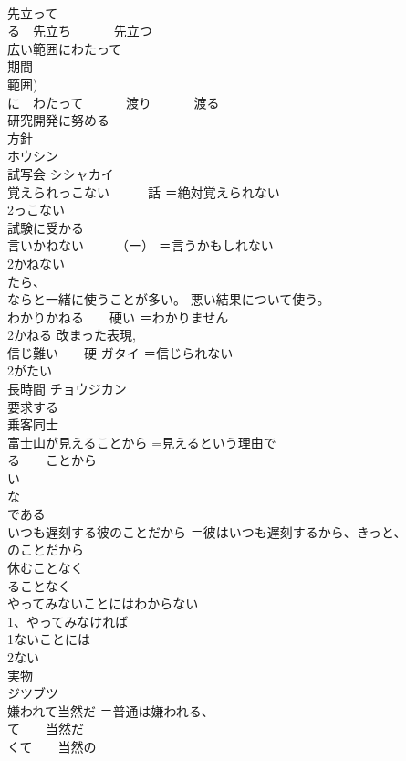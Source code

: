 \documentclass[8pt]{extreport}
\begin{document}
\begin{CJK}{UTF8}{min}
\\	先立って 
\\	る　先立ち 　　　先立つ
\\	広い範囲にわたって	
\\	期間 
\\	範囲) 
\\	に　わたって 　　　渡り 　　　渡る
\\	研究開発に努める	
\\	方針	
\\	ホウシン
\\	試写会	シシャカイ 
\\	覚えられっこない　　　話	＝絶対覚えられない 
\\	2っこない
\\	試験に受かる	
\\	言いかねない　　　（ー）	＝言うかもしれない 
\\	2かねない 
\\	たら、
\\	ならと一緒に使うことが多い。 悪い結果について使う。
\\	わかりかねる　　硬い	＝わかりません 
\\	2かねる 改まった表現, 
\\	信じ難い　　硬	ガタイ ＝信じられない 
\\	2がたい
\\	長時間	チョウジカン 
\\	要求する	
\\	乗客同士	
\\	富士山が見えることから	=見えるという理由で 
\\	る　　ことから 
\\	い 
\\	な 
\\	である
\\	いつも遅刻する彼のことだから	＝彼はいつも遅刻するから、きっと、
\\	のことだから
\\	休むことなく	
\\	ることなく
\\	やってみないことにはわからない	
\\	1、やってみなければ 
\\	1ないことには
\\	2ない
\\	実物	
\\	ジツブツ
\\	嫌われて当然だ	＝普通は嫌われる、
\\	て　　当然だ 
\\	くて　　当然の

\end{CJK}
\end{document}
